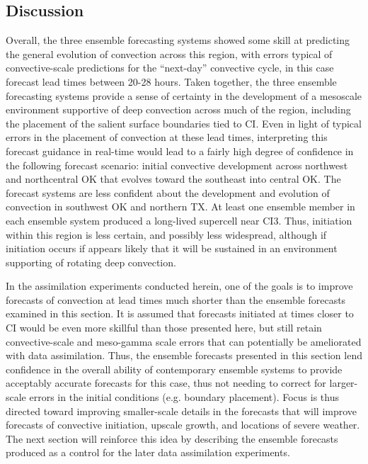\subsection{Discussion}
Overall, the three ensemble forecasting systems showed some skill at predicting the general evolution of convection across this region, with errors typical of convective-scale predictions for the “next-day” convective cycle, in this case forecast lead times between 20-28 hours. Taken together, the three ensemble forecasting systems provide a sense of certainty in the development of a mesoscale environment supportive of deep convection across much of the region, including the placement of the salient surface boundaries tied to CI. Even in light of typical errors in the placement of convection at these lead times, interpreting this forecast guidance in real-time would lead to a fairly high degree of confidence in the following forecast scenario: initial convective development across northwest and northcentral OK that evolves toward the southeast into central OK. The forecast systems are less confident about the development and evolution of convection in southwest OK and northern TX. At least one ensemble member in each ensemble system produced a long-lived supercell near CI3. Thus, initiation within this region is less certain, and possibly less widespread, although if initiation occurs if appears likely that it will be sustained in an environment supporting of rotating deep convection.

In the assimilation experiments conducted herein, one of the goals is to improve forecasts of convection at lead times much shorter than the ensemble forecasts examined in this section. It is assumed that forecasts initiated at times closer to CI would be even more skillful than those presented here, but still retain convective-scale and meso-gamma scale errors that can potentially be ameliorated with data assimilation. Thus, the ensemble forecasts presented in this section lend confidence in the overall ability of contemporary ensemble systems to provide acceptably accurate forecasts for this case, thus not needing to correct for larger-scale errors in the initial conditions (e.g. boundary placement). Focus is thus directed toward improving smaller-scale details in the forecasts that will improve forecasts of convective initiation, upscale growth, and locations of severe weather. The next section will reinforce this idea by describing the ensemble forecasts produced as a control for the later data assimilation experiments.

